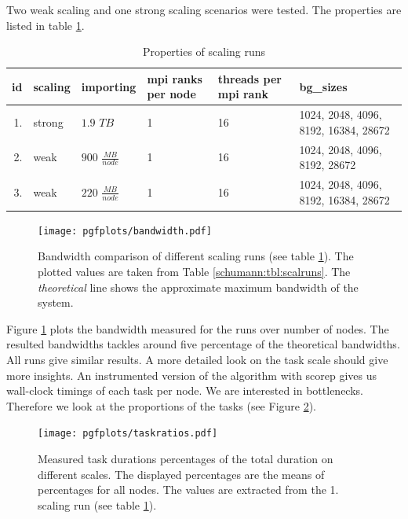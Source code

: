 Two weak scaling and one strong scaling scenarios were tested.
The properties are listed in table \ref{schumann:tbl:runs}.
\begin{table}[h!]
  \caption{Properties of scaling runs}
\begin{center}
\begin{tabular}{|r|l|p{1.5cm}|p{1.4cm}|p{1.4cm}|p{3cm}|}
\hline
id & scaling & importing & mpi ranks per node & threads per mpi rank & bg\_sizes \\
\hline\hline
1.    &  strong  & $1.9$ $TB$             & 1 & 16 & 1024, 2048, 4096, 8192, 16384, 28672 \\
2.    &  weak  & $900$ $\frac{MB}{node}$      & 1 & 16 & 1024, 2048, 4096, 8192, 28672 \\
3.    &  weak  & $220$ $\frac{MB}{node}$     & 1 & 16 & 1024, 2048, 4096, 8192, 16384, 28672 \\
\hline
\end{tabular}
\end{center}
\label{schumann:tbl:runs}
\end{table}
\begin{figure}[h!]
\begin{center}
 \texttt{[image: pgfplots/bandwidth.pdf]}
\end{center}
\caption{Bandwidth comparison of different scaling runs (see table \ref{schumann:tbl:runs}).
The plotted values are taken from Table \ref{schumann:tbl:scalruns}.
The \emph{theoretical} line shows the approximate maximum bandwidth of the system.}
\label{schumann:fig:bandwidth}
\end{figure}
Figure \ref{schumann:fig:bandwidth} plots the bandwidth measured for the runs over number of nodes.
The resulted bandwidths tackles around five percentage of the theoretical bandwidths.
All runs give similar results.
A more detailed look on the task scale should give more insights.
An instrumented version of the algorithm with scorep gives us wall-clock timings of each task per node.
We are interested in bottlenecks.
Therefore we look at the proportions of the tasks (see Figure \ref{schumann:fig:taskratios}).
\begin{figure}[h!]
\begin{center}
 \texttt{[image: pgfplots/taskratios.pdf]}
\end{center}
\caption{Measured task durations percentages of the total duration on different scales.
 The displayed percentages are the means of percentages for all nodes.
 The values are extracted from the 1. scaling run (see table \ref{schumann:tbl:runs}).
 }
\label{schumann:fig:taskratios}
\end{figure}
